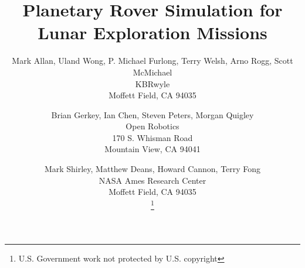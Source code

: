 \documentclass[twocolumn,letterpaper]{IEEEAerospaceCLS}  %
\begin{document}
\title{Planetary Rover Simulation for Lunar Exploration Missions}

\author{
Mark Allan, Uland Wong, P. Michael Furlong, Terry Welsh, Arno Rogg, Scott McMichael\\ 
KBRwyle \\
Moffett Field, CA 94035 \\
\and 
Brian Gerkey, Ian Chen, Steven Peters, Morgan Quigley \\
Open Robotics \\
170 S. Whisman Road \\
Mountain View, CA 94041 \\
\and
Mark Shirley, Matthew Deans, Howard Cannon, Terry Fong \\
NASA Ames Research Center \\
Moffett Field, CA 94035 \\
\thanks{{U.S. Government work not protected by U.S. copyright}}         %
}

\maketitle

\thispagestyle{plain}
\pagestyle{plain}

\maketitle

\thispagestyle{plain}
\pagestyle{plain}

\end{document}

